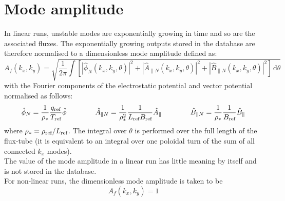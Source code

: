 \documentclass[a4paper]{report}
\begin{document}
\section{Mode amplitude}
In linear runs, unstable modes are exponentially growing in time and so are the associated fluxes. 
The exponentially growing outputs stored in the database are therefore normalised to a dimensionless mode amplitude defined as:
\begin{equation}
 A_f(k_x,k_y) = \sqrt{\frac{1}{2\pi}\left.\int \left[|\hat{\phi}_N(k_x,k_y,\theta)|^2 + |\hat{A}_{\parallel N}(k_x,k_y,\theta)|^2  + |\hat{B}_{\parallel N}(k_x,k_y,\theta)|^2\right] \,\textrm{d}\theta \right.}
\end{equation}
with the Fourier components of the electrostatic potential and vector potential normalised as follows:
\begin{equation}
  \hat{\phi}_N = \frac{1}{\rho_*}\frac{q_{\textrm{ref}}}{T_{\textrm{ref}}} \hat{\phi} \qquad \qquad 
  \hat{A}_{\parallel N}=\frac{1}{\rho_*^2}\frac{1}{L_{\textrm{ref}} B_{\textrm{ref}}} \hat{A}_\parallel \qquad \qquad
  \hat{B}_{\parallel N}=\frac{1}{\rho_*}\frac{1}{B_{\textrm{ref}}} \hat{B}_\parallel
\end{equation}
where $\rho_*=\rho_{\textrm{ref}}/L_{\textrm{ref}}$. The integral over $\theta$ is performed over the full length of the flux-tube (it is equivalent to an integral over one poloidal turn of the sum of all connected $k_x$ modes).\\
The value of the mode amplitude in a linear run has little meaning by itself and is not stored in the database.\\
For non-linear runs, the dimensionless mode amplitude is taken to be 
$$A_f(k_x,k_y) = 1$$
\end{document}
